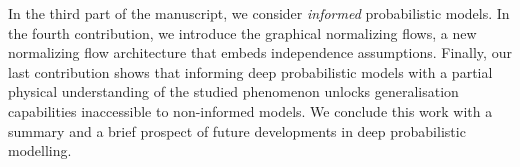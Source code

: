 In the third part of the manuscript, we consider \textit{informed} probabilistic models. In the fourth contribution, we introduce the graphical normalizing flows, a new normalizing flow architecture that embeds independence assumptions. Finally, our last contribution shows that informing deep probabilistic models with a partial physical understanding of the studied phenomenon unlocks generalisation capabilities inaccessible to non-informed models. We conclude this work with a summary and a brief prospect of future developments in deep probabilistic modelling.
